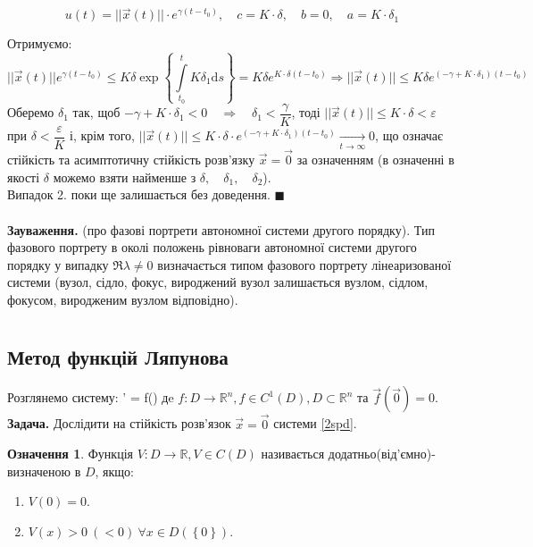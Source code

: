 \documentclass[14pt,a4paper]{scrartcl}
\theoremstyle{definition}
\newtheorem*{defo}{Означення}
\theoremstyle{definition}
\theoremstyle{definition}
\begin{document}
$$ u(t) = ||\overrightarrow{x}(t)|| \cdot e^{\gamma(t - t_0)}, \quad c = K \cdot \delta, \quad b = 0, \quad a = K \cdot \delta_1$$

Отримуємо: $$||\overrightarrow{x}(t)|| e^{\gamma(t - t_0)} \!\leq\! K \delta \exp \left\lbrace {\int\limits_{t_0}^{t} K \delta_1 \mathrm{d}s} \right\rbrace \!=\! K \delta e^{K \cdot \delta (t - t_0)} \!\Rightarrow\! ||\overrightarrow{x}(t)|| \!\leq\! K \delta e^{(-\gamma + K \cdot \delta_1)(t - t_0)}$$ Оберемо $\delta_1$ так, щоб $-\gamma + K \cdot \delta_1 < 0 \quad \Longrightarrow \quad \delta_1 < \dfrac{\gamma}{K}$, тоді $||\overrightarrow{x}(t)|| \leq K \cdot \delta < \varepsilon$ при $\delta < \dfrac{\varepsilon}{K}$ і, крім того, $||\overrightarrow{x}(t)|| \leq K \cdot \delta \cdot e^{(-\gamma + K \cdot \delta_1)(t - t_0)} \xrightarrow[t \to \infty]{} 0$, що означає стійкість та асимптотичну стійкість розв'язку $\overrightarrow{x} = \overrightarrow{0}$ за означенням (в означенні в якості $\delta$ можемо взяти найменше з $\delta, \quad \delta_1, \quad \delta_2$).\\ Випадок 2. поки ще залишається без доведення. $\blacksquare$ \\ \\
\textbf{Зауваження.} (про фазові портрети автономної системи другого порядку). Тип фазового портрету в околі положень рівноваги автономної системи другого порядку у випадку $\Re \lambda \neq 0$ визначається типом фазового портрету лінеаризованої системи (вузол, сідло, фокус, вироджений вузол залишається вузлом, сідлом, фокусом, виродженим вузлом відповідно). \\

\section{}
\subsection{Метод функцій Ляпунова}
Розглянемо систему:
\be \label{2spd}
 ' = f()
\ee
дe $f: D \to \mathbb{R}^n, f\in C^{1} \left( D \right), D \subset \mathbb{R}^n $ та $\overrightarrow{f} ( \overrightarrow{0}) = 0$. \textbf{Задача. } Дослідити на стійкість розв'язок $ \overrightarrow{x} = \overrightarrow{0}$ системи \eqref{2spd}.
 \begin{defo}
  Функція $V : D \to \mathbb{R}, V \in C(D) $ називається додатньо(від'ємно)-визначеною в $D$, якщо:
\begin{enumerate}
  \item $V(0) = 0$.
  \item $V(x) > 0 \ (<0) \ \forall x \in D(\left\lbrace 0 \right\rbrace)$.
\end{enumerate}
 \end{defo}
\end{document}
